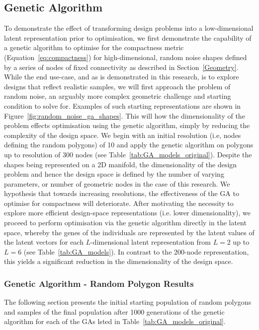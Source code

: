 \documentclass{article}
\begin{document}
\subsection{Genetic Algorithm}
To demonstrate the effect of transforming design problems into a low-dimensional latent representation prior to optimisation, we first demonstrate the capability of a genetic algorithm to optimise for the compactness metric (Equation~\eqref{eq:compactness}) for high-dimensional, random noise shapes defined by a series of nodes of fixed connectivity as described in Section~\ref{Geometry}. While the end use-case, and as is demonstrated in this research, is to explore designs that reflect realistic samples, we will first approach the problem of random noise, an arguably more complex geometric challenge and starting condition to solve for. Examples of such starting representations are shown in Figure~\ref{fig:random_noise_ga_shapes}. This will how the dimensionality of the problem effects optimisation using the genetic algorithm, simply by reducing the complexity of the design space. We begin with an initial resolution (i.e, nodes defining the random polygons) of 10 and apply the genetic algorithm on polygons up to resolution of 300 nodes (see Table~\ref{tab:GA_models_original}). Despite the shapes being represented on a 2D manifold, the dimensionality of the design problem and hence the design space is defined by the number of varying parameters, or number of geometric nodes in the case of this research. We hypothesis that towards increasing resolutions, the effectiveness of the GA to optimise for compactness will deteriorate. After motivating the necessity to explore more efficient design-space representations (i.e. lower dimensionality), we proceed to perform optimisation via the genetic algorithm directly in the latent space, whereby the genes of the individuals are represented by the latent values of the latent vectors for each $L$-dimensional latent representation from $L=2$ up to $L=6$ (see Table~\ref{tab:GA_models}). In contrast to the 200-node representation, this yields a significant reduction in the dimensionality of the design space.

\subsubsection{Genetic Algorithm - Random Polygon Results}\label{random_polygon_ga}
The following section presents the initial starting population of random polygons and samples of the final population after 1000 generations of the genetic algorithm for each of the GAs lsted in Table~\ref{tab:GA_models_original}.
\end{document}
